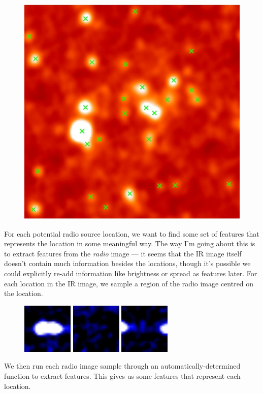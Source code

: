 \documentclass[a4paper]{article}
\begin{document}
    \begin{figure}[!ht]
        \centering
        \includegraphics[width=0.3\linewidth]{../images/ARG000180p_ir_potential_hosts.jpg}
    \end{figure}

    For each potential radio source location, we want to find some set of features that represents the location in some meaningful way. The way I'm going about this is to extract features from the \emph{radio} image --- it seems that the IR image itself doesn't contain much information besides the locations, though it's possible we could explicitly re-add information like brightness or spread as features later. For each location in the IR image, we sample a region of the radio image centred on the location.

    \begin{figure}[!ht]
        \centering
        \includegraphics[width=0.15\linewidth]{../images/radio_neighbourhood_1.png}\quad
        \includegraphics[width=0.15\linewidth]{../images/radio_neighbourhood_2.png}\quad
        \includegraphics[width=0.15\linewidth]{../images/radio_neighbourhood_3.png}
    \end{figure}

    We then run each radio image sample through an automatically-determined function to extract features. This gives us some features that represent each location.
\end{document}
